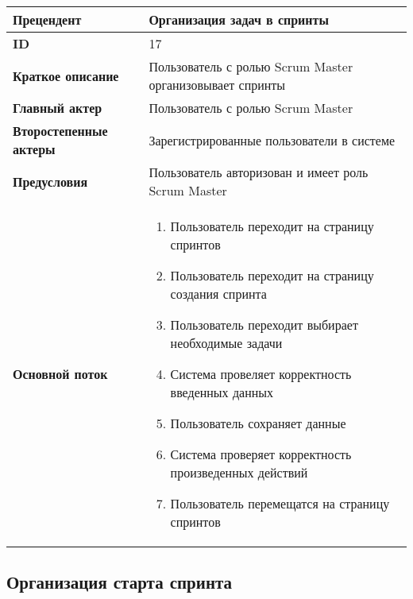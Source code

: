 \documentclass[14pt,a4paper]{extarticle}
\begin{document}
\begin{tabular}{|l|p{9cm}|}
	\hline
	\textbf{Прецендент}            & Организация задач в спринты                                \\
	\hline
	\textbf{ID}                    & 17                                                         \\
	\hline
	\textbf{Краткое описание}      & Пользователь с ролью Scrum Master организовывает спринты   \\
	\hline
	\textbf{Главный актер}         & Пользователь с ролью Scrum Master                          \\
	\hline
	\textbf{Второстепенные актеры} & Зарегистрированные пользователи в системе                  \\
	\hline
	\textbf{Предусловия}           & Пользователь авторизован и имеет роль Scrum Master         \\
	\hline
	\textbf{Основной поток}        & \begin{enumerate}
		                                 \item Пользователь переходит на страницу спринтов
		                                 \item Пользователь переходит на страницу создания спринта
		                                 \item Пользователь переходит выбирает необходимые задачи
		                                 \item Система провеляет корректность введенных данных
		                                 \item Пользователь сохраняет данные
		                                 \item Система проверяет корректность произведенных действий
		                                 \item Пользователь перемещатся на страницу спринтов
	                                 \end{enumerate} \\
	\hline
\end{tabular}

\subsection{Организация старта спринта}
\end{document}
